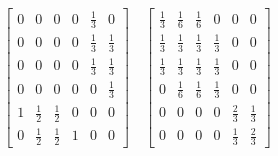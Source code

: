   \[ 
  \begin{bmatrix}
  0 & 0 & 0 & 0 & \frac{1}{3} & 0 \\[6pt]
  0 & 0 & 0 & 0 & \frac{1}{3} & \frac{1}{3}\\[6pt] 
  0 & 0 & 0 & 0 & \frac{1}{3} & \frac{1}{3}\\[6pt] 
  0 & 0 & 0 & 0 & 0 & \frac{1}{3}\\[6pt] 
  1 & \frac{1}{2} & \frac{1}{2} & 0 & 0 & 0\\[6pt] 
  0 & \frac{1}{2} & \frac{1}{2} & 1 & 0 & 0
  \end{bmatrix}
  \quad
  \begin{bmatrix}
  \frac{1}{3} & \frac{1}{6} & \frac{1}{6} & 0 & 0 & 0 \\[6pt] 
  \frac{1}{3} & \frac{1}{3} & \frac{1}{3} & \frac{1}{3} & 0 & 0\\[6pt] 
  \frac{1}{3} & \frac{1}{3} & \frac{1}{3} & \frac{1}{3} & 0 & 0\\[6pt] 
  0 & \frac{1}{6} & \frac{1}{6} & \frac{1}{3} & 0 & 0\\[6pt] 
  0 & 0 & 0 & 0 & \frac{2}{3} & \frac{1}{3}\\[6pt] 
  0 & 0 & 0 & 0 & \frac{1}{3} & \frac{2}{3}
  \end{bmatrix}
  \]